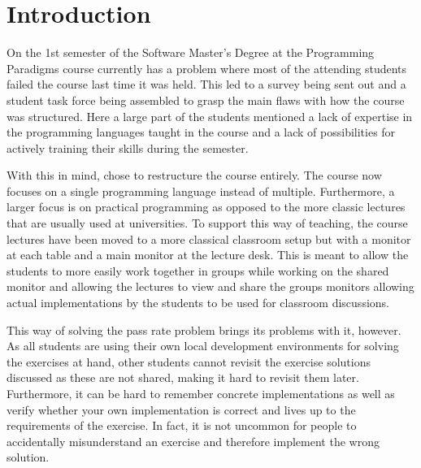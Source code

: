\chapter{Introduction} \label{chap:introduction}
On the 1st semester of the Software Master’s Degree at \aau{} the Programming Paradigms course currently has a problem where most of the attending students failed the course last time it was held. This led to a survey being sent out and a student task force being assembled to grasp the main flaws with how the course was structured. Here a large part of the students mentioned a lack of expertise in the programming languages taught in the course and a lack of possibilities for actively training their skills during the semester. 


With this in mind, \aau{} chose to restructure the course entirely. The course now focuses on a single programming language instead of multiple. Furthermore, a larger focus is on practical programming as opposed to the more classic lectures that are usually used at universities. To support this way of teaching, the course lectures have been moved to a more classical classroom setup but with a monitor at each table and a main monitor at the lecture desk. This is meant to allow the students to more easily work together in groups while working on the shared monitor and allowing the lectures to view and share the groups monitors allowing actual implementations by the students to be used for classroom discussions. 


This way of solving the pass rate problem brings its problems with it, however. As all students are using their own local development environments for solving the exercises at hand, other students cannot revisit the exercise solutions discussed as these are not shared, making it hard to revisit them later. Furthermore, it can be hard to remember concrete implementations as well as verify whether your own implementation is correct and lives up to the requirements of the exercise. In fact, it is not uncommon for people to accidentally misunderstand an exercise and therefore implement the wrong solution.  

